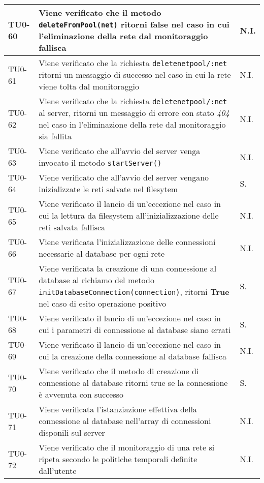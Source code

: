 \begin{longtable}{|C{.15\textwidth}|m{.66\textwidth}|C{.10\textwidth}|}
 
\hline
TU0-60 & Viene verificato che il metodo \texttt{deleteFromPool(net)} ritorni false nel caso in cui l'eliminazione della rete dal monitoraggio fallisca & N.I. \\ 
\hline 
{} TU0-61 & Viene verificato che la richiesta \texttt{deletenetpool/:net} ritorni un messaggio di successo nel caso in cui la rete viene tolta dal monitoraggio & N.I. \\ 
\hline 
TU0-62 & Viene verificato che la richiesta \texttt{deletenetpool/:net} al server, ritorni un messaggio di errore con stato \textit{404} nel caso in l'eliminazione della rete dal monitoraggio sia fallita & N.I. \\ 
\hline 
{} TU0-63 & Viene verificato che all'avvio del server venga invocato il metodo \texttt{startServer()} & N.I. \\ 
\hline
TU0-64 & Viene verificato che all'avvio del server vengano inizializzate le reti salvate nel filesytem & S. \\ 
\hline
{}TU0-65 & Viene verificato il lancio di un'eccezione nel caso in cui la lettura da filesystem all'inizializzazione delle reti salvata fallisca & N.I. \\ 
\hline
TU0-66 & Viene verificata l'inizializzazione delle connessioni necessarie al database per ogni rete & N.I. \\ 
\hline
{}TU0-67 &  Viene verificata la creazione di una connessione al database al richiamo del metodo \texttt{initDatabaseConnection(connection)}, ritorni \textbf{True} nel caso di esito operazione positivo & S.\\ 
\hline
TU0-68 & Viene verificato il lancio di un'eccezione nel caso in cui i parametri di connessione al database siano errati & S. \\
\hline
{} TU0-69 & Viene verificato il lancio di un'eccezione nel caso in cui la creazione della connessione al database fallisca & N.I. \\ 
\hline
TU0-70 & Viene verificato che il metodo di creazione di connessione al database ritorni true se la connessione è avvenuta con successo & S. \\ 
\hline 
{} TU0-71 & Viene verificata l'istanziazione effettiva della connessione al database nell'array di connessioni disponili sul server & N.I. \\ 
\hline 
TU0-72 & Viene verificato che il monitoraggio di una rete si ripeta secondo le politiche temporali definite dall'utente & N.I. \\ 

\end{longtable}
